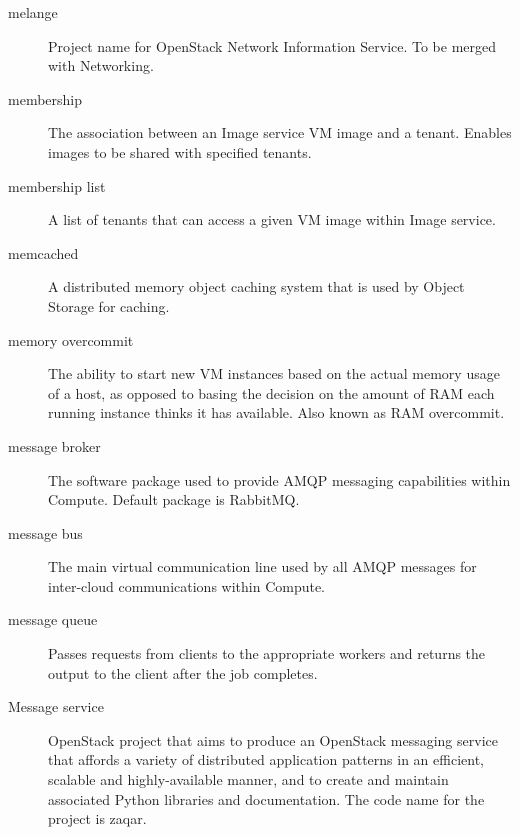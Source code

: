 \documentclass[letterpaper,10pt,english]{sphinxmanual}
\begin{document}
\begin{description}
\item[{melange}] \leavevmode{}\label{_source/glossary:term-melange}
Project name for OpenStack Network Information Service. To be
merged with Networking.

\item[{membership}] \leavevmode{}\label{_source/glossary:term-membership}
The association between an Image service VM image and a tenant.
Enables images to be shared with specified tenants.

\item[{membership list}] \leavevmode{}\label{_source/glossary:term-membership-list}
A list of tenants that can access a given VM image within Image
service.

\item[{memcached}] \leavevmode{}\label{_source/glossary:term-memcached}
A distributed memory object caching system that is used by
Object Storage for caching.

\item[{memory overcommit}] \leavevmode{}\label{_source/glossary:term-memory-overcommit}
The ability to start new VM instances based on the actual memory
usage of a host, as opposed to basing the decision on the amount of
RAM each running instance thinks it has available. Also known as RAM
overcommit.

\item[{message broker}] \leavevmode{}\label{_source/glossary:term-message-broker}
The software package used to provide AMQP messaging capabilities
within Compute. Default package is RabbitMQ.

\item[{message bus}] \leavevmode{}\label{_source/glossary:term-message-bus}
The main virtual communication line used by all AMQP messages
for inter-cloud communications within Compute.

\item[{message queue}] \leavevmode{}\label{_source/glossary:term-message-queue}
Passes requests from clients to the appropriate workers and
returns the output to the client after the job completes.

\item[{Message service}] \leavevmode{}\label{_source/glossary:term-message-service}
OpenStack project that aims to produce an OpenStack
messaging service that affords a variety of distributed
application patterns in an efficient, scalable and
highly-available manner, and to create and maintain associated
Python libraries and documentation. The code name for the
project is zaqar.


\end{description}
\end{document}
